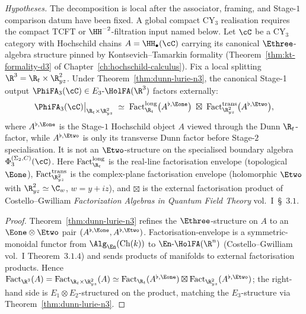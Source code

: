\begin{theorem}
\label{thm:phifa3-longitudinal-transverse}
\noindent\emph{Hypotheses.} The decomposition is local after the associator,
framing, and Stage-$1$ comparison datum have been fixed. A global compact CY$_3$
realisation requires the compact TCFT or \(\HH^{-2}\)-filtration input
named below.
Let $\cC$ be a CY$_3$ category with Hochschild chains $A = \HH_\bullet(\cC)$ carrying its canonical $\Ethree$-algebra structure pinned by Kontsevich--Tamarkin formality (Theorem~\ref{thm:kt-formality-d3} of Chapter~\ref{ch:hochschild-calculus}). Fix a local splitting $\R^3 = \R_t \times \R^2_{yz}$. Under Theorem~\ref{thm:dunn-lurie-n3}, the canonical Stage-1 output $\PhiFA_3(\cC) \in E_3\text{-}\HolFA(\R^3)$ factors externally:
\[
 \PhiFA_3(\cC)\big|_{\R_t \times \R^2_{yz}}
 \;\simeq\;
 \mathrm{Fact}^{\mathrm{long}}_{\R_t}\bigl(A^{\flat, \Eone}\bigr)
 \;\boxtimes\;
 \mathrm{Fact}^{\mathrm{trans}}_{\R^2_{yz}}\bigl(A^{\flat, \Etwo}\bigr),
\]
where $A^{\flat, \Eone}$ is the Stage-$1$ Hochschild object $A$
viewed through the Dunn $\R_t$-factor, while $A^{\flat, \Etwo}$ is
only its transverse Dunn factor before Stage-$2$ specialisation. It is
not an $\Etwo$-structure on the specialised boundary algebra
$\Phi_3^{(\Sigma_2,C)}(\cC)$. Here
$\mathrm{Fact}^{\mathrm{long}}_{\R_t}$ is the real-line factorisation
envelope (topological $\Eone$),
$\mathrm{Fact}^{\mathrm{trans}}_{\R^2_{yz}}$ is the complex-plane
factorisation envelope (holomorphic $\Etwo$ with
$\R^2_{yz} \simeq \C_w$, $w = y + iz$), and $\boxtimes$ is the
external factorisation product of Costello--Gwilliam
\textit{Factorization Algebras in Quantum Field Theory} vol.~I~\S~$3.1$.
\end{theorem}

\begin{proof}
Theorem~\ref{thm:dunn-lurie-n3} refines the $\Ethree$-structure on $A$ to an $\Eone \otimes \Etwo$ pair $(A^{\flat, \Eone}, A^{\flat, \Etwo})$. Factorisation-envelope is a symmetric-monoidal functor from $\Alg_{\En}(\mathrm{Ch}(k))$ to $\En\text{-}\HolFA(\R^n)$ (Costello--Gwilliam vol.~I Theorem~$3.1.4$) and sends products of manifolds to external factorisation products. Hence $\mathrm{Fact}_{\R^3}(A) = \mathrm{Fact}_{\R_t \times \R^2_{yz}}(A) \simeq \mathrm{Fact}_{\R_t}(A^{\flat, \Eone}) \boxtimes \mathrm{Fact}_{\R^2_{yz}}(A^{\flat, \Etwo})$; the right-hand side is $E_1 \otimes E_2$-structured on the product, matching the $E_3$-structure via Theorem~\ref{thm:dunn-lurie-n3}.
\end{proof}

